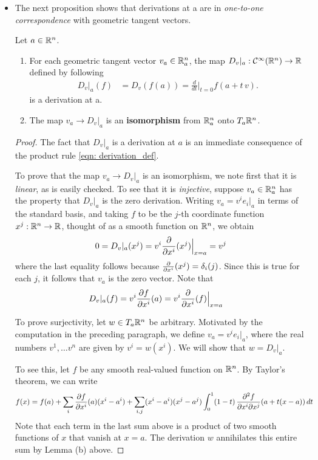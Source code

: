 \documentclass[11pt]{article}
\begin{document}
\begin{itemize}
\item The next proposition shows that derivations at a are in \emph{one-to-one correspondence} with geometric tangent vectors.
\begin{proposition} \label{prop: iso_geo_tangent}
Let $a \in {\mathbb R}^n$.
\begin{enumerate}
\item For each geometric tangent vector $v_a \in {\mathbb R}_{a}^n$, the map $D_v|_a: {\mathcal C}^{\infty}({\mathbb R}^n) \rightarrow {\mathbb R}$ defined by following
\begin{align}
D_v|_a(f) &= D_{v}(f(a)) = \frac{d}{dt}\Big|_{t=0}f(a + t\,v). \label{eqn: directional_derivative}
\end{align}
 is a derivation at a.
\item The map $v_a \rightarrow D_v|_a$ is an \textbf{isomorphism} from ${\mathbb R}_{a}^n$ onto $T_{a}{\mathbb R}^n$.
\end{enumerate}
\end{proposition}
\begin{proof}
The fact that $D_v|_a$ is a derivation at $a$ is an immediate consequence of the product rule \eqref{eqn: derivation_def}.

To prove that the map $v_a \rightarrow D_v|_a$  is an isomorphism, we note first that it is \emph{linear}, as is easily checked. To see that it is \emph{injective}, suppose $v_a \in {\mathbb R}_{a}^n$ has the property that $D_v|_a$ is the zero derivation. Writing $v_a = v^i e_i|_a$ in terms of the standard basis, and taking $f$ to be the $j$-th coordinate function $x^j: {\mathbb R}^n \rightarrow {\mathbb R}$, thought of as a smooth function on ${\mathbb R}^n$, we obtain
\begin{align*}
 0 =D_v|_a(x^{j}) = v^{i}\frac{\partial }{ \partial x^{i}}(x^{j})\Bigr|_{x = a} = v^{j}
\end{align*} where the last equality follows because $\frac{\partial }{ \partial x^{i}}(x^{j}) = \delta_{i}(j)$. Since this is true for each $j$, it follows that $v_a$ is the zero vector. Note that 
\begin{align*}
D_v|_a(f) &= v^{i}\frac{\partial f}{ \partial x^{i}}(a) = v^{i}\frac{\partial }{ \partial x^{i}}(f)\Bigr|_{x = a}
\end{align*}

To prove surjectivity, let $w \in T_{a}{\mathbb R}^n$ be arbitrary. Motivated by the computation in the preceding paragraph, we define $v_a = v^i e_i|_a$, where the real numbers $v^1, \ldots v^n$ are given by $v^i = w(x^i)$. We will show that $w = D_v|_a$.

To see this, let $f$ be any smooth real-valued function on ${\mathbb R}^n$. By Taylor's theorem, we can write
\begin{align*}
f(x) &= f(a) + \sum_{i}\frac{\partial f}{ \partial x^{i}}(a)(x^i - a^i) + \sum_{i,j}(x^i - a^i)(x^j - a^j)\int_{0}^{1}(1-t)\,\frac{\partial ^2 f}{ \partial x^{i}\partial x^{j}}(a + t(x - a))\,dt
\end{align*} Note that each term in the last sum above is a product of two smooth functions of $x$ that vanish at $x = a$. The derivation $w$ annihilates this entire sum by Lemma (b) above.


\end{proof}
\end{itemize}
\end{document}
